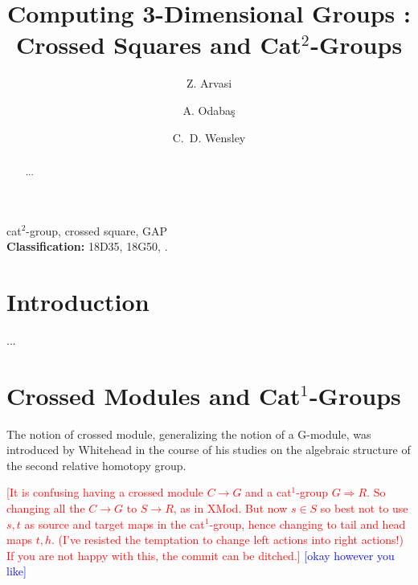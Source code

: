 \documentclass[a4paper,11pt]{article}
\theoremstyle{plain}
\theoremstyle{definition}
\begin{document}
\title{Computing 3-Dimensional Groups : Crossed Squares and  Cat$^2$-Groups}

\author[a]{Z. Arvasi}
\author[a]{A. Odaba\c{s}}
\author[b]{C.~D. Wensley}

\date{}

\maketitle

\begin{abstract}
...\end{abstract}

 cat$^2$-group, crossed square, \textsf{GAP}
\\ {\bf Classification:} 18D35, 18G50, .

\section{Introduction}

...

\section{Crossed Modules and Cat$^{1}$-Groups}

The notion of crossed module, generalizing the notion of a G-module, 
was introduced by Whitehead \cite{wayted} in the course of his studies on the
algebraic structure of the second relative homotopy group.


\vspace*{4mm}
\textcolor{red}
{[It is confusing having a crossed module $C \to G$ 
and a cat$^1$-group $G \Rightarrow R$. 
So changing all the $C \to G$ to $S \to R$, as in XMod. 
But now $s \in S$ so best not to use $s,t$ as source and target maps 
in the cat$^1$-group, hence changing to tail and head maps $t,h$. 
(I've resisted the temptation to change left actions into right actions!) 
If you are not happy with this, the commit can be ditched.]
} 
\textcolor{blue}
{[okay however you like]} 
\vspace*{4mm}
\end{document}

